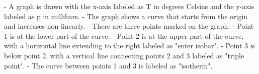 - A graph is drawn with the x-axis labeled as T in degrees Celsius and the y-axis labeled as p in millibars.
- The graph shows a curve that starts from the origin and increases non-linearly.
- There are three points marked on the graph:
  - Point 1 is at the lower part of the curve.
  - Point 2 is at the upper part of the curve, with a horizontal line extending to the right labeled as "enter isobar".
  - Point 3 is below point 2, with a vertical line connecting points 2 and 3 labeled as "triple point".
  - The curve between points 1 and 3 is labeled as "isotherm".
